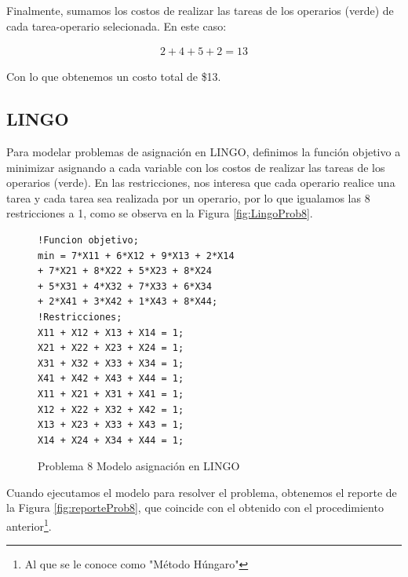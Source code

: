 \documentclass[12pt]{article}  %
\begin{document}
Finalmente, sumamos los costos de realizar las tareas de los operarios (verde) de cada tarea-operario selecionada. En este caso:

\begin{align}
2 + 4 + 5 + 2 = 13
\end{align}

Con lo que obtenemos un costo total de \$13.

\subsection{LINGO}
Para modelar problemas de asignación en LINGO, definimos la función objetivo a minimizar asignando a cada variable con los costos de realizar las tareas de los operarios (verde). En las restricciones, nos interesa que cada operario realice una tarea y cada tarea sea realizada por un operario, por lo que igualamos las 8 restricciones a 1, como se observa en la Figura \ref{fig:LingoProb8}.

\begin{figure}[H]
	\centering
	\caption{Problema 8 Modelo asignación en LINGO}
	\label{fig:lingoProb8}
	\begin{verbatim}
!Funcion objetivo;
min = 7*X11 + 6*X12 + 9*X13 + 2*X14 
+ 7*X21 + 8*X22 + 5*X23 + 8*X24 
+ 5*X31 + 4*X32 + 7*X33 + 6*X34 
+ 2*X41 + 3*X42 + 1*X43 + 8*X44;
!Restricciones;
X11 + X12 + X13 + X14 = 1;
X21 + X22 + X23 + X24 = 1;
X31 + X32 + X33 + X34 = 1;
X41 + X42 + X43 + X44 = 1;
X11 + X21 + X31 + X41 = 1;
X12 + X22 + X32 + X42 = 1;
X13 + X23 + X33 + X43 = 1;
X14 + X24 + X34 + X44 = 1;
	\end{verbatim}
\end{figure}

Cuando ejecutamos el modelo para resolver el problema, obtenemos el reporte de la Figura \ref{fig:reporteProb8}, que coincide con el obtenido con el procedimiento anterior\footnote{Al que se le conoce como "Método Húngaro"}.
\end{document}

